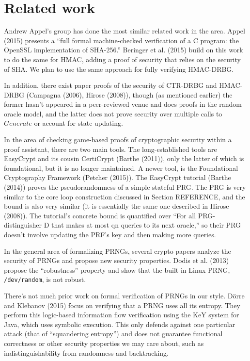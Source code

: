 \documentclass[12pt,lot, lof]{puthesis}
\begin{document}
\section{Related work}

Andrew Appel's group has done the most similar related work in the area. Appel (2015) presents a ``full formal machine-checked verification of a C program: the OpenSSL implementation of SHA-256.'' Beringer et al. (2015) build on this work to do the same for HMAC, adding a proof of security that relies on the security of SHA. We plan to use the same approach for fully verifying HMAC-DRBG.

In addition, there exist paper proofs of the security of CTR-DRBG and HMAC-DRBG (Campagna (2006), Hirose (2008)), though (as mentioned earlier) the former hasn't appeared in a peer-reviewed venue and does proofs in the random oracle model, and the latter does not prove security over multiple calls to $Generate$ or account for state updating.

In the area of checking game-based proofs of cryptographic security within a proof assistant, there are two main tools. The long-established tools are EasyCrypt and its cousin CertiCrypt (Barthe (2011)), only the latter of which is foundational, but it is no longer maintained. A newer tool, is the Foundational Cryptography Framework (Petcher (2015)). The EasyCrypt tutorial (Barthe (2014)) proves the pseudorandomness of a simple stateful PRG. The PRG is very similar to the core loop construction discussed in Section REFERENCE, and the bound is also very similar (it is essentially the same one described in Hirose (2008)). The tutorial's concrete bound is quantified over ``For all PRG-distinguisher D that makes at most qn queries to its next oracle,'' so their PRG doesn't involve updating the PRF's key and then making more queries.

In the general area of formalizing PRNGs, several crypto papers analyze the security of PRNGs and propose new security properties. Dodis et al. (2013) propose the ``robustness'' property and show that the built-in Linux PRNG, \texttt{/dev/random}, is not robust.

There's not much prior work on formal verification of PRNGs in our style. D{\"o}rre and Klebanov (2015)  focus on verifying that a PRNG uses all its entropy. They perform this logic-based information flow verification using the KeY system for Java, which uses symbolic execution. This only defends against one particular attack (that of ``squandering entropy'') and does not guarantee functional correctness or other security properties we may care about, such as indistinguishability from randomness and backtracking.
\end{document}
